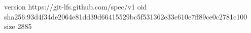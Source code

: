 version https://git-lfs.github.com/spec/v1
oid sha256:93d4f34de2064e81dd39d66415529bc5f531362e33c610e7ff89ce0c2781c100
size 2885
